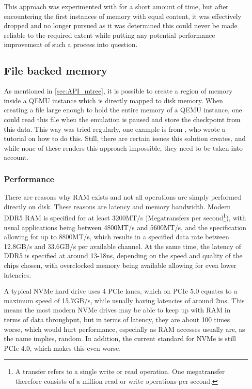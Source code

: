 This approach was experimented with for a short amount of time,
but after encountering the first instances of memory with equal content,
it was effectively dropped and no longer pursued
as it was determined this could never be made reliable to the required extent
while putting any potential performance improvement of such a process into question.

\subsection{File backed memory}
As mentioned in \autoref{sec:API_mtree},
it is possible to create a region of memory inside a QEMU instance
which is directly mapped to disk memory.
When creating a file large enough to hold the entire memory of a QEMU instance,
one could read this file when the emulation is paused and store the checkpoint from this data.
This way was tried regularly, one example is from ,
who wrote a tutorial on how to do this\cite{QEMU_memory_file}.
Still, there are certain issues this solution creates,
and while none of these renders this approach impossible,
they need to be taken into account.

\subsubsection{Performance}
There are reasons why RAM exists and not all operations are simply performed directly on disk.
These reasons are latency and memory bandwidth.
Modern DDR5 RAM is specified for at least 3200MT/s (Megatransfers per second\footnote{A transfer refers to a single write or read operation. One megatransfer therefore consists of a million read or write operations per second.}),
with usual applications being between 4800MT/s and 5600MT/s,
and the specification allowing for up to 8800MT/s,
which results in a specified data rate between 12.8GB/s and 33.6GB/s per available channel.
At the same time, the latency of DDR5 is specified at around 13-18ns,
depending on the speed and quality of the chips chosen,
with overclocked memory being available allowing for even lower latencies\cite[p.392-406]{JEDEC}.

A typical NVMe hard drive uses 4 PCIe lanes, which on PCIe 5.0 equates to a maximum speed of 15.7GB/s,
while usually having latencies of around 2ms.
This means the most modern NVMe drives may be able to keep up with RAM in terms of data throughput,
but in terms of latency, they are about 100 times worse,
which would hurt performance, especially as RAM accesses usually are, as the name implies, random.
In addition, the current standard for NVMe is still PCIe 4.0, which makes this even worse.

